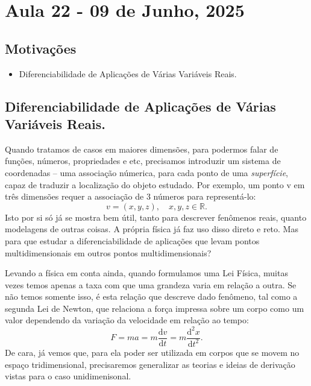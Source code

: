 \documentclass[../analysisII_notes.tex]{subfiles}
\begin{document}
\section{Aula 22 - 09 de Junho, 2025}
\subsection{Motivações}
\begin{itemize}
	\item Diferenciabilidade de Aplicações de Várias Variáveis Reais.
\end{itemize}
\subsection{Diferenciabilidade de Aplicações de Várias Variáveis Reais.}
Quando tratamos de casos em maiores dimensões, para podermos falar de funções, números, propriedades e etc, precisamos introduzir um sistema de coordenadas -- uma associação númerica, para cada ponto de uma \textit{superfície}, capaz de traduzir a localização do objeto estudado. Por exemplo, um ponto v em três dimensões requer a associação de 3 números para representá-lo:
\[
	v = (x, y, z),\quad x,y,z\in \mathbb{R}.
\]
Isto por si só já se mostra bem útil, tanto para descrever fenômenos reais, quanto modelagens de outras coisas. A própria física já faz uso disso direto e reto. Mas para que estudar a diferenciabilidade de aplicações que levam pontos multidimensionais em outros pontos multidimensionais?

Levando a física em conta ainda, quando formulamos uma Lei Física, muitas vezes temos apenas a taxa com que uma grandeza varia em relação a outra. Se não temos somente isso, é esta relação que descreve dado fenômeno, tal como a segunda Lei de Newton, que relaciona a força impressa sobre um corpo como um valor dependendo da variação da velocidade em relação ao tempo:
\[
	F = m a = m \frac{\mathrm{d}v}{\mathrm{d}t} = m \frac{\mathrm{d}^{2}x}{\mathrm{d}t^{2}}.
\]
De cara, já vemos que, para ela poder ser utilizada em corpos que se movem no espaço tridimensional, precisaremos generalizar as teorias e ideias de derivação vistas para o caso unidimenisonal.
\end{document}
